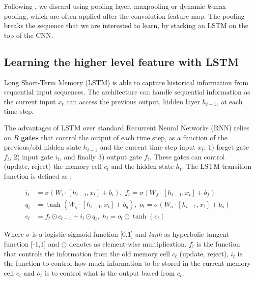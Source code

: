 \documentclass[phd,tocprelim]{cornell}
\begin{document}
Following \cite{zhou2015c}, we discard using pooling layer, maxpooling or dynamic $k$-max pooling, which are often applied after the convolution feature map. The pooling breaks the sequence that we are interested to learn, by stacking an LSTM on the top of the CNN.


\subsection{Learning the higher level feature with LSTM} 
Long Short-Term Memory (LSTM) \cite{hochreiter1997long} is able to capture historical information from sequential input sequences. The architecture can handle sequential information as the current input $x_t$ can access the previous output, hidden layer $h_{t-1}$, at each time step.

The advantages of LSTM over standard Recurrent Neural Networks (RNN) relies on $R$ \textbf{gates} that control the output of each time step, as a function of the previous/old hidden state $h_{t-1}$ and the current time step input $x_t$: 1) forget gate $f_t$, 2) input gate $i_t$, and finally 3) output gate $f_t$. These gates can control (update, reject) the memory cell $c_t$ and the hidden state $h_t$. The LSTM transition function is defined as :

 
 \begin {equation} 
\begin{aligned} i_{t} &=\sigma\left(W_{i} \cdot\left[h_{t-1}, x_{t}\right]+b_{i}\right), \;
f_{t} =\sigma\left(W_{f} \cdot\left[h_{t-1}, x_{t}\right]+b_{f}\right) \\
q_{t} &=\tanh \left(W_{q} \cdot\left[h_{t-1}, x_{t}\right]+b_{q}\right), \;
o_{t} =\sigma\left(W_{o} \cdot\left[h_{t-1}, x_{t}\right]+b_{o}\right) \\
c_{t} &=f_{t} \odot c_{t-1}+i_{t} \odot q_{t},  \;
h_{t} =o_{t} \odot \tanh \left(c_{t}\right)
\end{aligned}
 \end {equation}

Where $\sigma$ is a logistic sigmoid function [0,1] and \textit{tanh} as hyperbolic tangent function [-1,1] and  $\odot$  denotes as element-wise multiplication. $f_t$ is the function that controls the information from the old memory cell $c_t$ (update, reject), $i_t$ is the function to control how much information to be stored in the current memory cell $c_t$ and $o_t$ is to control what is the output based from $c_t$. 
\end{document}
